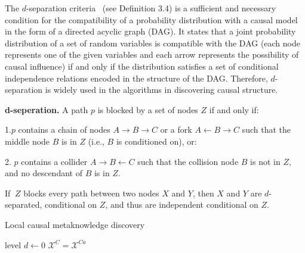 The $d$-separation criteria~\cite{glymour2016causal} (see Definition 3.4) is a sufficient and necessary condition for the compatibility of a probability distribution with a causal model in the form of a directed acyclic graph (DAG).
It states that a joint probability distribution of a set of random variables is compatible with the DAG (each node represents one of the given variables and each arrow represents the possibility of causal influence) if and only if the distribution satisfies a set of conditional independence relations encoded in the structure of the DAG.
Therefore, $d$-separation is widely used in the algorithms in discovering causal structure\cite{giudice2022dual,sondhi2019reduced,gerhardus2020high}.

\begin{definitionnew}
\textbf{d-seperation.} A path $p$ is blocked by a set of nodes $Z$ if and only if:

1.$p$ contains a chain of nodes $A \to B\to C$ or a fork $A \gets B\to C$ such that the middle node $B$ is in $Z$ (i.e., $B$ is conditioned on), or:

2. $p$ contains a collider $A \to B \gets C$ such that the collision node $B$ is not in $Z$, and no descendant of $B$ is in $Z$.

If $~Z$ blocks every path between two nodes $X$ and $Y$, then $X$ and $Y$ are $d$-separated, conditional on $Z$, and thus are independent conditional on $Z$.
\end{definitionnew}


\begin{algorithm2e}
\caption{Local causal metaknowledge discovery}
\label{alg:pc-like}
level $d \gets 0$\;
$\mathcal{X}^{C} = \mathcal{X}^{Ca}$
\end{algorithm2e}

